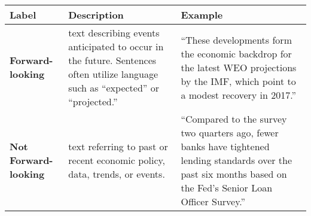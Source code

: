 \begin{table*}
    \caption{}
    \begin{tabular}{p{}p{}p{}}
    \toprule
    \textbf{Label} & \textbf{Description} & \textbf{Example}\\
    \midrule
    \textbf{Forward-looking} & text describing events anticipated to occur in the future. Sentences often utilize language such as “expected” or “projected.” & “These developments form the economic backdrop for the latest WEO projections by the IMF, which point to a modest recovery in 2017.” \\
    \midrule
    \textbf{Not Forward-looking} & text referring to past or recent economic policy, data, trends, or events. & “Compared to the survey two quarters ago, fewer banks have tightened lending standards over the past six months based on the Fed’s Senior Loan Officer Survey.” \\
    \bottomrule
    \end{tabular}
    \label{tb:bsp_forward_looking_guide}
    \end{table*}